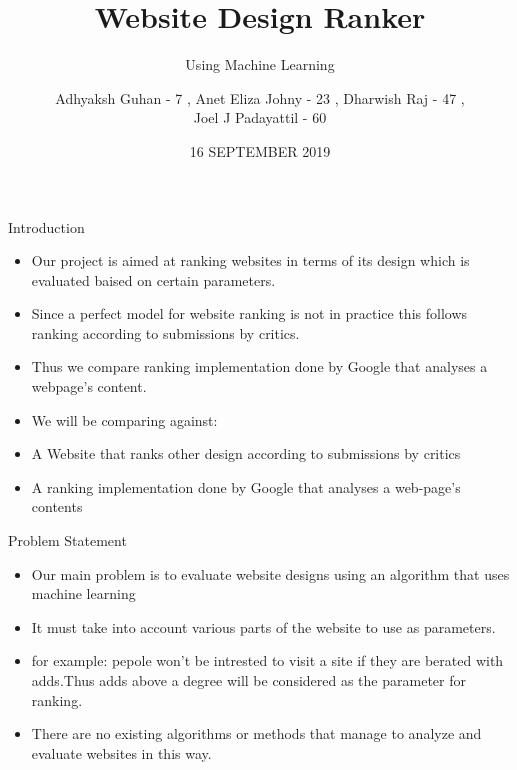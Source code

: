 \documentclass[11pt]{beamer}
\begin{document}
	\title{\textbf{Website Design Ranker}}
	\subtitle{Using Machine Learning}
	\date{16 SEPTEMBER 2019}
	\author{{\scriptsize Adhyaksh Guhan - 7 , Anet Eliza Johny - 23 , Dharwish Raj - 47 , \\ Joel J Padayattil - 60}}
	\begin{frame}[plain]
		\maketitle
	\end{frame}
	\begin{frame}{Introduction}
		\begin{itemize}
			
			
			\item Our project is aimed at ranking websites in terms of its design which is evaluated baised on certain parameters.
			
			\item Since a perfect model for website ranking  is not in practice this  follows ranking according to submissions by critics.
			
			\item Thus we compare ranking implementation done by Google that analyses a webpage's content.
		
			\item We will be comparing against:
				\item A Website that ranks other design according to submissions by critics
				\item A ranking implementation done by Google that analyses a web-page's contents
		\end{itemize}
	\end{frame}
	\begin{frame}{Problem Statement}
		\begin{itemize}

			\item Our main problem is to evaluate website designs using an algorithm that uses machine learning
			
			\item It must take into account various parts of the website to use as parameters.
			
			\item for example: pepole won't be intrested to visit a site if they are berated with adds.Thus adds above a degree will be considered as the parameter for ranking.

			\item There are no existing algorithms or methods that manage to analyze and evaluate websites in this way.
		\end{itemize}
	\end{frame}
\end{document}
